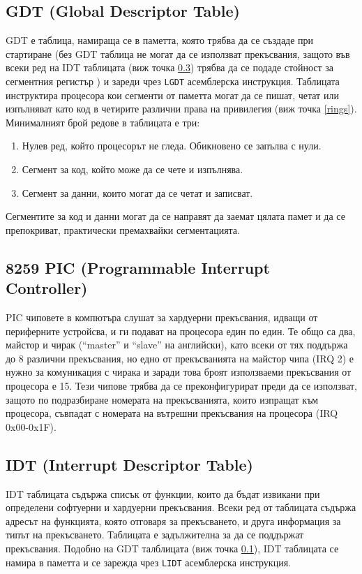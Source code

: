   \subsection{GDT (Global Descriptor Table)} \label{gdt}
  GDT е таблица, намираща се в паметта, която трябва да се създаде при стартиране (без GDT таблица не могат да се използват прекъсвания, защото във всеки ред на IDT таблицата (виж точка \ref{idt}) трябва да се подаде стойност за сегментния регистър \cite[глава~6.11]{intel-manual-3a}) и зареди чрез {\tt LGDT} асемблерска инструкция. Таблицата инструктира процесора кои сегменти от паметта могат да се пишат, четат или изпълняват като код в четирите различни права на привилегия (виж точка \ref{rings}). Минималният брой редове в таблицата е три:
  \begin{enumerate}
    \item Нулев ред, който процесорът не гледа. Обикновено се запълва с нули.
    \item Сегмент за код, който може да се чете и изпълнява.
    \item Сегмент за данни, които могат да се четат и записват.
  \end{enumerate}
  Сегментите за код и данни могат да се направят да заемат цялата памет и да се препокриват, практически премахвайки сегментацията.

  \subsection{8259 PIC (Programmable Interrupt Controller)} \label{pic}
  PIC чиповете в компютъра слушат за хардуерни прекъсвания, идващи от периферните устройсва, и ги подават на процесора един по един. Те общо са два, майстор и чирак (``master'' и ``slave'' на английски), като всеки от тях поддържа до 8 различни прекъсвания, но едно от прекъсванията на майстор чипа (IRQ 2) е нужно за комуникация с чирака и заради това броят използваеми прекъсвания от процесора е 15. Тези чипове трябва да се преконфигурират преди да се използват, защото по подразбиране номерата на прекъсванията, които изпращат към процесора, съвпадат с номерата на вътрешни прекъсвания на процесора (IRQ 0x00-0x1F).

  \subsection{IDT (Interrupt Descriptor Table)} \label{idt}
  IDT таблицата съдържа списък от функции, които да бъдат извикани при определени софтуерни и хардуерни прекъсвания. Всеки ред от таблицата съдържа адресът на функцията, която отговаря за прекъсването, и друга информация за типът на прекъсването. Таблицата е задължителна за да се поддържат прекъсвания. Подобно на GDT талблицата (виж точка \ref{gdt}), IDT таблицата се намира в паметта и се зарежда чрез {\tt LIDT} асемблерска инструкция.

